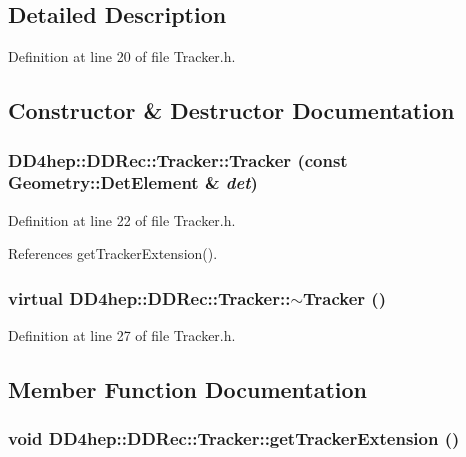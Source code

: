 \subsection{Detailed Description}


Definition at line 20 of file Tracker.h.

\subsection{Constructor \& Destructor Documentation}
\hypertarget{class_d_d4hep_1_1_d_d_rec_1_1_tracker_acd3f6faae57cfcd0cf7925e1473358ba}{
\subsubsection[{Tracker}]{\setlength{\rightskip}{0pt plus 5cm}DD4hep::DDRec::Tracker::Tracker (const {\bf Geometry::DetElement} \& {\em det})}}
\label{class_d_d4hep_1_1_d_d_rec_1_1_tracker_acd3f6faae57cfcd0cf7925e1473358ba}


Definition at line 22 of file Tracker.h.

References getTrackerExtension().\hypertarget{class_d_d4hep_1_1_d_d_rec_1_1_tracker_a8ac29fb4a453989eebf2201e6a2fca9f}{
\subsubsection[{$\sim$Tracker}]{\setlength{\rightskip}{0pt plus 5cm}virtual DD4hep::DDRec::Tracker::$\sim$Tracker ()}}
\label{class_d_d4hep_1_1_d_d_rec_1_1_tracker_a8ac29fb4a453989eebf2201e6a2fca9f}


Definition at line 27 of file Tracker.h.

\subsection{Member Function Documentation}
\hypertarget{class_d_d4hep_1_1_d_d_rec_1_1_tracker_aff21170847730cec8db36f09873ef52c}{
\subsubsection[{getTrackerExtension}]{\setlength{\rightskip}{0pt plus 5cm}void DD4hep::DDRec::Tracker::getTrackerExtension ()}}
\label{class_d_d4hep_1_1_d_d_rec_1_1_tracker_aff21170847730cec8db36f09873ef52c}


